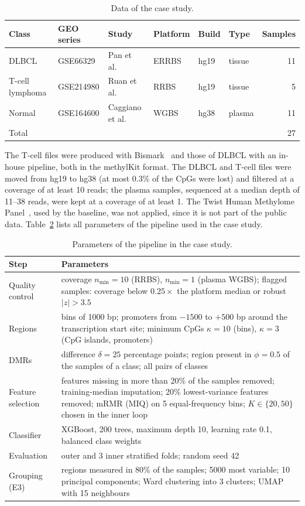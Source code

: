 \documentclass[runningheads]{llncs}
\begin{document}
\begin{table}[!htb]
\centering
\caption{Data of the case study.}
\label{tab:case}
\small
\begin{tabular}{llllllr}
\toprule
Class & GEO series & Study & Platform & Build & Type & Samples \\
\midrule
DLBCL & GSE66329 & Pan et al.~\cite{pan2015} & ERRBS & hg19 & tissue & 11 \\
T-cell lymphoma & GSE214980 & Ruan et al.~\cite{ruan2023} & RRBS & hg19 & tissue & 5 \\
Normal & GSE164600 & Caggiano et al.~\cite{caggiano2021} & WGBS & hg38 & plasma & 11 \\
\midrule
Total & & & & & & 27 \\
\bottomrule
\end{tabular}
\end{table}

The T-cell files were produced with Bismark~\cite{krueger2011} and those of DLBCL with an in-house pipeline, both in the methylKit format. The DLBCL and T-cell files were moved from hg19 to hg38 (at most 0.3\% of the CpGs were lost) and filtered at a coverage of at least 10 reads; the plasma samples, sequenced at a median depth of 11--38 reads, were kept at a coverage of at least 1. The Twist Human Methylome Panel~\cite{twist2025}, used by the baseline, was not applied, since it is not part of the public data. Table~\ref{tab:params} lists all parameters of the pipeline used in the case study.

\begin{table}[!htb]
\centering
\caption{Parameters of the pipeline in the case study.}
\label{tab:params}
\small
\begin{tabular}{>{\raggedright\arraybackslash}p{3.2cm}>{\raggedright\arraybackslash}p{11.4cm}}
\toprule
Step & Parameters \\
\midrule
Quality control & coverage $n_{\min}=10$ (RRBS), $n_{\min}=1$ (plasma WGBS); flagged samples: coverage below $0.25\times$ the platform median or robust $|z|>3.5$ \\
Regions & bins of 1000 bp; promoters from $-1500$ to $+500$ bp around the transcription start site; minimum CpGs $\kappa=10$ (bins), $\kappa=3$ (CpG islands, promoters) \\
DMRs & difference $\delta=25$ percentage points; region present in $\phi=0.5$ of the samples of a class; all pairs of classes \\
Feature selection & features missing in more than 20\% of the samples removed; training-median imputation; 20\% lowest-variance features removed; mRMR (MIQ) on 5 equal-frequency bins; $K\in\{20,50\}$ chosen in the inner loop \\
Classifier & XGBoost, 200 trees, maximum depth 10, learning rate 0.1, balanced class weights \\
Evaluation & 5 outer and 3 inner stratified folds; random seed 42 \\
Grouping (E3) & regions measured in 80\% of the samples; 5000 most variable; 10 principal components; Ward clustering into 3 clusters; UMAP with 15 neighbours \\
\bottomrule
\end{tabular}
\end{table}
\end{document}

